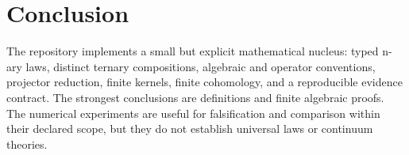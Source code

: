 \section{Conclusion}

The repository implements a small but explicit mathematical nucleus: typed n-ary laws, distinct ternary compositions, algebraic and operator conventions, projector reduction, finite kernels, finite cohomology, and a reproducible evidence contract. The strongest conclusions are definitions and finite algebraic proofs. The numerical experiments are useful for falsification and comparison within their declared scope, but they do not establish universal laws or continuum theories.


